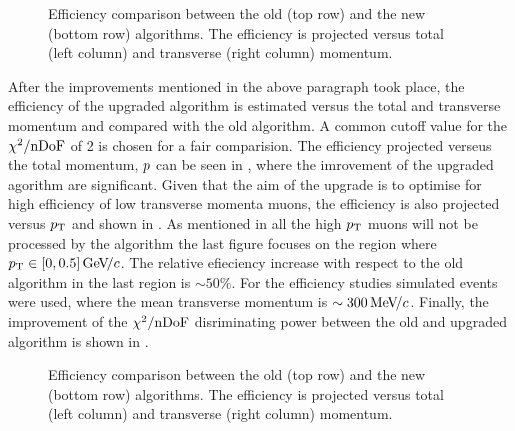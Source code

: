 \begin{figure}[t]
  \centering
  \begin{subfigure}{0.5\textwidth}
    \scalebox{.6}{}
    \caption{}
    \label{mvTTm_eff_p}
  \end{subfigure}%
  \hfill%
  \begin{subfigure}{0.5\textwidth}
    \scalebox{.6}{}
    \caption{}
    \label{mvm_eff_p}
  \end{subfigure}
  \caption{Efficiency comparison between the old \mvm (top row) and the new \mvTTm (bottom row) algorithms.
 The efficiency is projected versus total (left column) and transverse (right column) momentum.  }
 \label{mvm_eff_pt_zoom_comp}
\end{figure}

After the improvements mentioned in the above paragraph took place, the efficiency of the upgraded \mvTTm algorithm
is estimated versus the total and transverse momentum and compared with the old algorithm. A common cutoff value for
the $\chi^2/{\rm nDoF}$ of 2 is chosen for a fair comparision. The efficiency projected verseus the total momentum, $\mbox{$p$}$
can be seen in , where the imrovement of the upgraded \mvTTm agorithm are significant.
Given that the aim of the \mvTTm upgrade is to optimise for high efficiency of low transverse momenta muons,
the efficiency is also projected versus $\mbox{$p_{\rm T}$}$ and shown in . As mentioned in 
all the high $\mbox{$p_{\rm T}$}$ muons will not be processed by the \mvTTm algorithm the last figure focuses on the region where $\mbox{$p_{\rm T}$}\in[0,0.5]{\mathrm{\,Ge\kern -0.1em V\!/}c}$.
The relative efieciency increase with respect to the old \mvm algorithm in the last region is $\sim 50\%$.
For the efficiency studies simulated \Sigmapmumu events were used, where the mean transverse momentum is $\sim 300{\mathrm{\,Me\kern -0.1em V\!/}c}$.
Finally, the improvement of the $\chi^2/{\rm nDoF}$ disriminating power between the old and upgraded algorithm is shown in .

\begin{figure}[t]
  \centering
  \begin{subfigure}{0.5\textwidth}
    \scalebox{.6}{}
    \caption{}
    \label{mvTTm_eff_p}
  \end{subfigure}%
  \hfill%
  \begin{subfigure}{0.5\textwidth}
    \scalebox{.6}{}
    \caption{}
    \label{mvm_eff_p}
  \end{subfigure}
  \caption{Efficiency comparison between the old \mvm (top row) and the new \mvTTm (bottom row) algorithms.
 The efficiency is projected versus total (left column) and transverse (right column) momentum.  }
 \label{mvm_eff_p_comp}
\end{figure}

